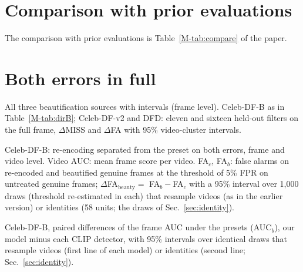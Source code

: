 \documentclass[10pt]{article}
\begin{document}
\section{Comparison with prior evaluations}
\label{sec:compare}
\begin{table}[H]\centering\caption{The comparison with prior evaluations is Table~\ref{M-tab:compare} of the paper.}\label{tab:compare}\end{table}

\section{Both errors in full}
\label{sec:twosidedfull}
\begin{table}[H]
\centering
\caption{All three beautification sources with intervals (frame level). Celeb-DF-B as in Table~\ref{M-tab:dirB}; Celeb-DF-v2
and DFD: eleven and sixteen held-out filters on the full frame, $\Delta$MISS and $\Delta$FA with 95\% video-cluster intervals.}
\label{tab:twosidedfull}
\scriptsize
\begin{adjustbox}{max width=\linewidth}\end{adjustbox}
\end{table}
\begin{table}[H]
\centering
\caption{Celeb-DF-B: re-encoding separated from the preset on both errors, frame and video level. Video AUC: mean frame score per
video. FA$_c$, FA$_b$: false alarms on re-encoded and beautified genuine frames at the threshold of 5\% FPR on untreated genuine
frames; $\Delta$FA$_\text{beauty}=$ FA$_b-$FA$_c$ with a 95\% interval over 1,000 draws (threshold re-estimated in each) that
resample videos (as in the earlier version) or identities (58 units; the draws of Sec.~\ref{sec:identity}).}
\label{tab:cdfbextra}
\scriptsize
\begin{adjustbox}{max width=\linewidth}\end{adjustbox}
\end{table}
\begin{table}[H]
\centering
\caption{Celeb-DF-B, paired differences of the frame AUC under the presets (AUC$_b$), our model minus each CLIP detector, with
95\% intervals over identical draws that resample videos (first line of each model) or identities (second line; Sec.~\ref{sec:identity}).}
\label{tab:cdfbpaired}
\footnotesize
\begin{adjustbox}{max width=\linewidth}\end{adjustbox}
\end{table}
\end{document}
